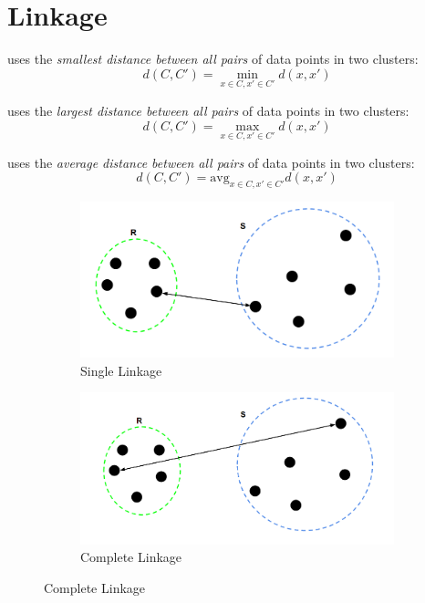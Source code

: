 \documentclass[
	number={6},
	title={Clustering}
]{cs584notes}
\begin{document}
\section{Linkage}\label{sec:linkage}
\begin{description}[font=\emph]
	\item[Single Linkage] uses the \emph{smallest distance between all pairs} of data points in two clusters:
	\begin{equation}
		d(C, C') = \min_{x\in C, x{'}\in C{'}} d(x, x{'})
		\label{eq:single-linkage}
	\end{equation}
	\item[Complete Linkage] uses the \emph{largest distance between all pairs} of data points in two clusters:
	\begin{equation}
		d(C, C') = \max_{x\in C, x{'}\in C{'}} d(x, x{'})
		\label{eq:complete-linkage}
	\end{equation}
	\item[Average Linkage] uses the \emph{average distance between all pairs} of data points in two clusters:
	\begin{equation}
		d(C, C') = {\mbox{avg}}_{x\in C, x{'}\in C{'}} d(x, x{'})
		\label{eq:average-linkage}
	\end{equation}
\end{description}

\begin{figure}[H]
	\centering
	\begin{subfigure}{0.475\textwidth}
		\includegraphics[width=\textwidth]{figures/6/single_linkage}
		\caption{Single Linkage}
		\label{fig:single-linkage}
	\end{subfigure}\hfill
	\begin{subfigure}{0.475\textwidth}
		\includegraphics[width=\textwidth]{figures/6/complete_linkage}
		\caption{Complete Linkage}
		\label{fig:complete-linkage}
	\end{subfigure}
	\label{fig:linkage}
\end{figure}
\end{document}
